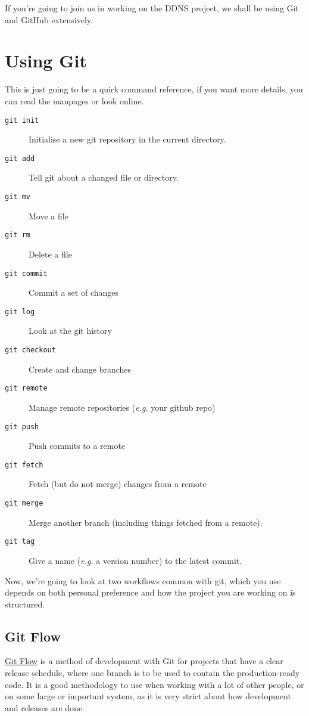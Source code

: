 \documentclass[12pt,a4paper]{article}
\begin{document}
If you're going to join us in working on the DDNS project, we shall be
using Git and GitHub extensively.

\pagebreak
\section{Using Git}

This is just going to be a quick command reference, if you want more
details, you can read the manpages or look online.

\begin{description}
  \item[\texttt{git init}] Initialise a new git repository in the
    current directory.
  \item[\texttt{git add}] Tell git about a changed file or directory.
  \item[\texttt{git mv}] Move a file
  \item[\texttt{git rm}] Delete a file
  \item[\texttt{git commit}] Commit a set of changes
  \item[\texttt{git log}] Look at the git history
  \item[\texttt{git checkout}] Create and change branches
  \item[\texttt{git remote}] Manage remote repositories
    (\textit{e.g.} your github repo)
  \item[\texttt{git push}] Push commits to a remote
  \item[\texttt{git fetch}] Fetch (but do not merge) changes from a
    remote
  \item[\texttt{git merge}] Merge another branch (including things
    fetched from a remote).
  \item[\texttt{git tag}] Give a name (\textit{e.g.} a version
    number) to the latest commit.
\end{description}

Now, we're going to look at two workflows common with git, which you
use depends on both personal preference and how the project you are
working on is structured.

\subsection{Git Flow}

\href{http://nvie.com/posts/a-successful-git-branching-model/}{Git
  Flow} is a method of development with Git for projects that have a
clear release schedule, where one branch is to be used to contain the
production-ready code. It is a good methodology to use when working
with a lot of other people, or on some large or important system, as
it is very strict about how development and releases are done.
\end{document}
